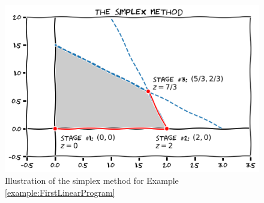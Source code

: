 \begin{example}
\begin{figure}[ht!]
\includegraphics[width=0.75\linewidth]{images/simplex.png}
\caption{Illustration of the simplex method for Example \ref{example:FirstLinearProgram}}
\label{figure:simplexmethod}
\end{figure}
\end{example}

